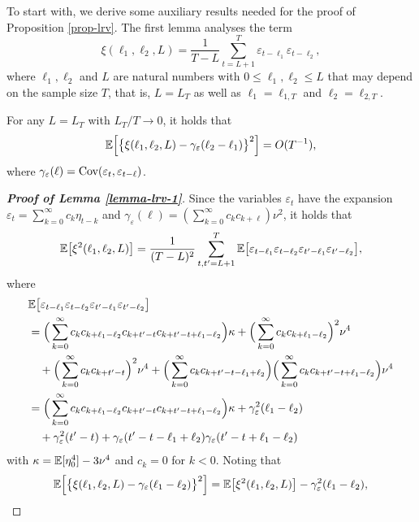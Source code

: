 To start with, we derive some auxiliary results needed for the proof of Proposition \ref{prop-lrv}. The first lemma analyses the term 
\[ \xi(\ell_1,\ell_2,L) =  \frac{1}{T-L} \sum\limits_{t=L+1}^{T} \varepsilon_{t-\ell_1} \varepsilon_{t-\ell_2}, \]
where $\ell_1,\ell_2$ and $L$ are natural numbers with $0 \le \ell_1, \ell_2 \le L$ that may depend on the sample size $T$, that is, $L = L_T$ as well as $\ell_1 = \ell_{1,T}$ and $\ell_2 = \ell_{2,T}$. 
\begin{lemmaA}\label{lemma-lrv-1} 
For any $L = L_T$ with $L_T/T \rightarrow 0$, it holds that 
\[ \mathbb{E} \Big[ \big\{ \xi(\ell_1,\ell_2,L) - \gamma_\varepsilon(\ell_2-\ell_1) \big\}^2 \Big] = O(T^{-1}), \]
where $\gamma_\varepsilon(\ell) = \textnormal{Cov}(\varepsilon_t,\varepsilon_{t-\ell})$.
\end{lemmaA}
\begin{proof}[\textnormal{\textbf{Proof of Lemma \ref{lemma-lrv-1}}}] 
Since the variables $\varepsilon_t$ have the expansion $\varepsilon_t = \sum_{k=0}^{\infty} c_k \eta_{t-k}$ and $\gamma_\varepsilon(\ell) = (\sum_{k=0}^\infty c_k c_{k+\ell}) \nu^2$, it holds that 
\[ \mathbb{E} \big[ \xi^2(\ell_1,\ell_2,L)\big] = \frac{1}{(T-L)^2} \sum\limits_{t,t^\prime=L+1}^T \mathbb{E} \big[ \varepsilon_{t-\ell_1} \varepsilon_{t-\ell_2} \varepsilon_{t^\prime-\ell_1} \varepsilon_{t^\prime-\ell_2} \big], \]
where
\begin{align*} 
 & \mathbb{E} \big[ \varepsilon_{t-\ell_1} \varepsilon_{t-\ell_2} \varepsilon_{t^\prime-\ell_1} \varepsilon_{t^\prime-\ell_2} \big] \\*
 & = \Big( \sum_{k=0}^{\infty} c_k c_{k+\ell_1-\ell_2} c_{k+t^\prime-t} c_{k+t^\prime-t+\ell_1-\ell_2} \Big) \kappa +  \Big( \sum_{k=0}^{\infty} c_k c_{k+\ell_1-\ell_2} \Big)^2 \nu^4 \\*
 & \quad + \Big( \sum_{k=0}^{\infty} c_k c_{k+t^\prime-t} \Big)^2 \nu^4 + \Big( \sum_{k=0}^{\infty} c_k c_{k+t^\prime-t-\ell_1+\ell_2} \Big) \Big( \sum_{k=0}^{\infty} c_k c_{k+t^\prime-t+\ell_1-\ell_2} \Big) \nu^4 \\
 & = \Big( \sum_{k=0}^{\infty} c_k c_{k+\ell_1-\ell_2} c_{k+t^\prime-t} c_{k+t^\prime-t+\ell_1-\ell_2} \Big) \kappa + \gamma_\varepsilon^2(\ell_1-\ell_2) \\*
 & \quad + \gamma_\varepsilon^2(t^\prime-t) + \gamma_\varepsilon(t^\prime-t-\ell_1+\ell_2) \gamma_\varepsilon(t^\prime-t+\ell_1-\ell_2)
\end{align*}
with $\kappa=\mathbb{E}[\eta_0^4] - 3 \nu^4$ and $c_k=0$ for $k < 0$. Noting that 
\[ \mathbb{E} \Big[ \big\{ \xi(\ell_1,\ell_2,L) - \gamma_\varepsilon(\ell_1-\ell_2) \big\}^2 \Big] = \mathbb{E} \big[\xi^2(\ell_1,\ell_2,L)\big] - \gamma_\varepsilon^2(\ell_1-\ell_2), \] 

\end{proof}

